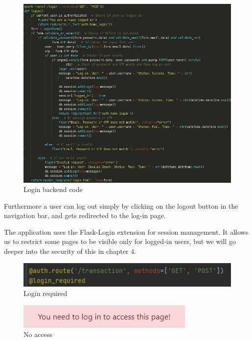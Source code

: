 \begin{figure}[H]
    \centering
    \includegraphics[width=\textwidth]{pics/pic8 login.png}
    \caption{Login backend code}
    \label{fig:cha2fig3logincode}
\end{figure}

Furthermore a user can log out simply by clicking on the logout button in the navigation bar, and gets redirected to the log-in page. 

The application uses the Flask-Login extension for session management. It allows us to restrict some pages to be visible only for logged-in users, but we will go deeper into the security of this in chapter 4. %

\begin{figure}[H]
   \centering
   \includegraphics[width=\textwidth]{pics/pic9.1 loginrequired.PNG}
   \caption{Login required}
   \label{fig:cha2fig3loginrequired}
\end{figure}

\begin{figure}[H]
   \centering
   \includegraphics[width=\textwidth]{pics/pic9.2 need to log in.PNG}
   \caption{No access}
   \label{fig:cha2fig4noaccess}
\end{figure}

